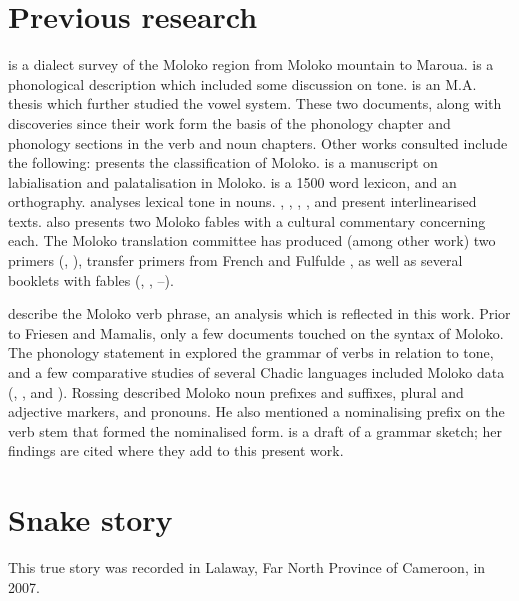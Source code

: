 \section{Previous research}\label{sec:1.3}
\hypertarget{RefHeading1210301525720847}{}
\citet{Bradley1992} is a dialect survey of the Moloko region from Moloko mountain to Maroua. \citet{Bow1997c} is a phonological description which included some discussion on tone. \citet{Bow1999} is an M.A. thesis which further studied the vowel system.  These two documents, along with discoveries since their work form the basis of the phonology chapter and phonology sections in the verb and noun chapters. Other works consulted include the following:  \citet{Bow1997a} presents the classification of Moloko. \citet{Bow1997b} is a manuscript on labialisation and palatalisation in Moloko. \citet{StarrBoydBow2000} is a 1500 word lexicon, and \citet{Friesen2001} an orthography.  \citet{Boyd2002} analyses lexical tone in nouns.  \citet{Boyd2001}, \citet{OumarBoyd2002}, \citet{HolmakaBoyd2002}, \citet{Holmaka2002}, and \citet{Friesen2003} present interlinearised texts. \citet{Friesen2003} also presents two Moloko fables with a cultural commentary concerning each.  The Moloko translation committee has produced (among other work) two primers (\citealt{MTC2004a}, \citeyear{MTC2008}), transfer primers from French \citep{MTC2005a} and Fulfulde \citep{MTC2007a}, as well as several booklets with fables (\citealt{MTC2004b}, \citeyear{MTC2005b}, \citeyear{MTC2007a}--\citeyear{MTC2007d}).\enlargethispage{1\baselineskip}

\citet{FriesenMamalis2008} describe the Moloko verb phrase, an analysis which is reflected in this work. Prior to Friesen and Mamalis, only a few documents touched on the syntax of Moloko. The phonology statement in \citeyear{Bow1997c} explored the grammar of verbs in relation to tone, and a few comparative studies of several Chadic languages included Moloko data (\citealt{Rossing1978}, \citealt{Blama1980}, and \citealt{deColombel1982}). Rossing described Moloko noun prefixes and suffixes, plural and adjective markers, and pronouns.  He also mentioned a nominalising prefix on the verb stem that formed the nominalised form. \citet{Boyd2003} is a draft of a grammar sketch; her findings are cited where they add to this present work. 

\clearpage
\section[Snake story]{Snake story}\label{sec:1.4}
\hypertarget{RefHeading1210321525720847}{}
This true story was recorded in Lalaway, Far North Province of Cameroon, in 2007.  

